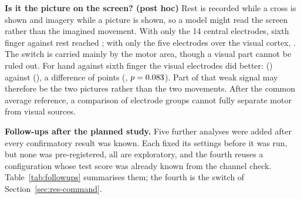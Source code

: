 \textbf{Is it the picture on the screen? (post hoc)} Rest is recorded while a cross is
shown and imagery while a picture is shown, so a model might read the screen rather than
the imagined movement. With only the 14 central electrodes, sixth finger against rest
reached \pct{\rqFourCueSfRestCentralMean}; with only the five electrodes over the visual
cortex, \pct{\rqFourCueSfRestParietoOccipitalMean}. The switch is carried mainly by the
motor area, though a visual part cannot be ruled out. For hand against sixth finger the
visual electrodes did better: \pct{\rqFourCueAhSfParietoOccipitalMean}
(\ci{\rqFourCueAhSfParietoOccipitalCiLo}{\rqFourCueAhSfParietoOccipitalCiHi}) against
\pct{\rqFourCueAhSfCentralMean}
(\ci{\rqFourCueAhSfCentralCiLo}{\rqFourCueAhSfCentralCiHi}), a difference of
\rqFourCueAhSfParietoOccipitalVsCentralDiff{} points
(\cipts{\rqFourCueAhSfParietoOccipitalVsCentralDiffCiLo}{\rqFourCueAhSfParietoOccipitalVsCentralDiffCiHi},
$p = 0.083$). Part of that weak signal may therefore be
the two pictures rather than the two movements. After the common average reference, a
comparison of electrode groups cannot fully separate motor from visual sources.

\textbf{Follow-ups after the planned study.} Five further analyses were added after every
confirmatory result was known. Each fixed its settings before it was run, but none was
pre-registered, all are exploratory, and the fourth reuses a configuration whose test
score was already known from the channel check. Table~\ref{tab:followups} summarises them;
the fourth is the switch of Section~\ref{sec:res-command}.

